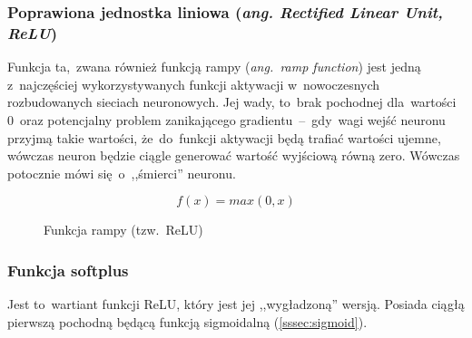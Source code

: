 \subsubsection{Poprawiona jednostka liniowa (\textit{ang. Rectified Linear Unit, ReLU})}
Funkcja ta,~zwana również funkcją rampy (\textit{ang.~ramp function}) jest jedną z~najczęściej wykorzystywanych funkcji
aktywacji w~nowoczesnych rozbudowanych sieciach neuronowych. Jej wady, to~brak pochodnej dla~wartości 0~oraz potencjalny
problem zanikającego gradientu~--~gdy~wagi wejść neuronu przyjmą takie wartości, że~do~funkcji aktywacji będą trafiać
wartości ujemne, wówczas neuron będzie ciągle generować wartość wyjściową równą zero. Wówczas potocznie mówi
się~o~,,śmierci'' neuronu.

\begin{minipage}[t]{\textwidth}
\begin{equation}
	f(x) = max(0,x)
\end{equation}
\begin{figure}[H]
    \centering
    \caption{Funkcja rampy (tzw.~ReLU)}
\end{figure}
\end{minipage}

\subsubsection{Funkcja softplus}
Jest to~wartiant funkcji ReLU, który jest jej ,,wygładzoną'' wersją. Posiada ciągłą pierwszą pochodną będącą funkcją
sigmoidalną (\ref{sssec:sigmoid}).

